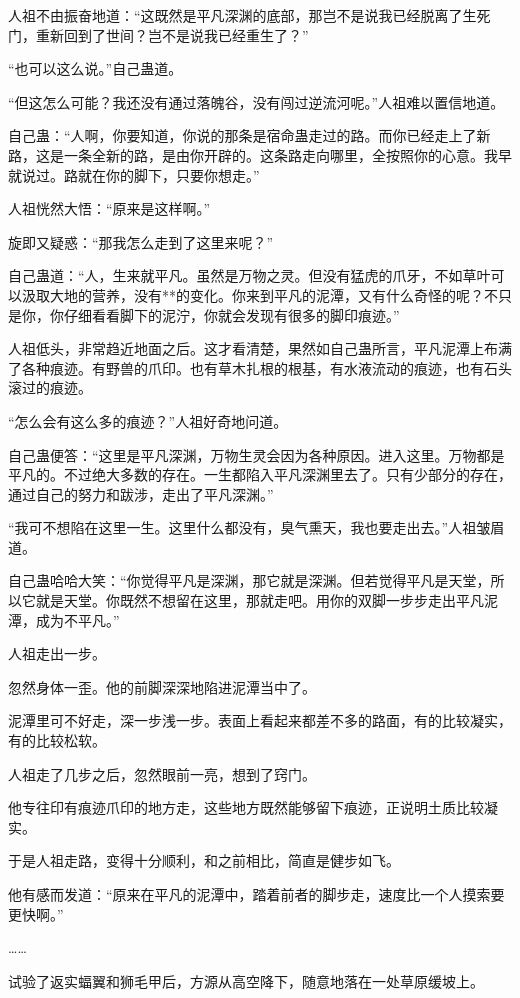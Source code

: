 \begin{this_body}
人祖不由振奋地道：“这既然是平凡深渊的底部，那岂不是说我已经脱离了生死门，重新回到了世间？岂不是说我已经重生了？”

“也可以这么说。”自己蛊道。

“但这怎么可能？我还没有通过落魄谷，没有闯过逆流河呢。”人祖难以置信地道。

自己蛊：“人啊，你要知道，你说的那条是宿命蛊走过的路。而你已经走上了新路，这是一条全新的路，是由你开辟的。这条路走向哪里，全按照你的心意。我早就说过。路就在你的脚下，只要你想走。”

人祖恍然大悟：“原来是这样啊。”

旋即又疑惑：“那我怎么走到了这里来呢？”

自己蛊道：“人，生来就平凡。虽然是万物之灵。但没有猛虎的爪牙，不如草叶可以汲取大地的营养，没有**的变化。你来到平凡的泥潭，又有什么奇怪的呢？不只是你，你仔细看看脚下的泥泞，你就会发现有很多的脚印痕迹。”

人祖低头，非常趋近地面之后。这才看清楚，果然如自己蛊所言，平凡泥潭上布满了各种痕迹。有野兽的爪印。也有草木扎根的根基，有水液流动的痕迹，也有石头滚过的痕迹。

“怎么会有这么多的痕迹？”人祖好奇地问道。

自己蛊便答：“这里是平凡深渊，万物生灵会因为各种原因。进入这里。万物都是平凡的。不过绝大多数的存在。一生都陷入平凡深渊里去了。只有少部分的存在，通过自己的努力和跋涉，走出了平凡深渊。”

“我可不想陷在这里一生。这里什么都没有，臭气熏天，我也要走出去。”人祖皱眉道。

自己蛊哈哈大笑：“你觉得平凡是深渊，那它就是深渊。但若觉得平凡是天堂，所以它就是天堂。你既然不想留在这里，那就走吧。用你的双脚一步步走出平凡泥潭，成为不平凡。”

人祖走出一步。

忽然身体一歪。他的前脚深深地陷进泥潭当中了。

泥潭里可不好走，深一步浅一步。表面上看起来都差不多的路面，有的比较凝实，有的比较松软。

人祖走了几步之后，忽然眼前一亮，想到了窍门。

他专往印有痕迹爪印的地方走，这些地方既然能够留下痕迹，正说明土质比较凝实。

于是人祖走路，变得十分顺利，和之前相比，简直是健步如飞。

他有感而发道：“原来在平凡的泥潭中，踏着前者的脚步走，速度比一个人摸索要更快啊。”

……

试验了返实蝠翼和狮毛甲后，方源从高空降下，随意地落在一处草原缓坡上。


\end{this_body}
